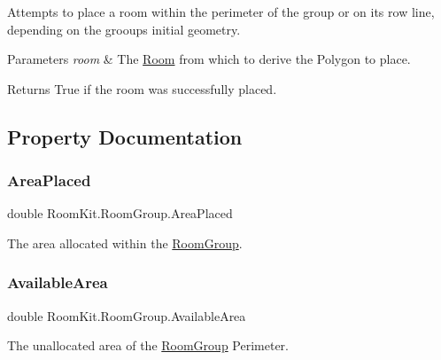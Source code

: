 Attempts to place a room within the perimeter of the group or on its row line, depending on the grooup\textquotesingle{}s initial geometry. 


\begin{DoxyParams}{Parameters}
{\em room} & The \mbox{\hyperlink{class_room_kit_1_1_room}{Room}} from which to derive the Polygon to place.\\
\hline
\end{DoxyParams}
\begin{DoxyReturn}{Returns}
True if the room was successfully placed. 
\end{DoxyReturn}


\subsection{Property Documentation}
\mbox{\label{class_room_kit_1_1_room_group_af3839f139987ea48a2e5db693d3ff957}} 
\subsubsection{\texorpdfstring{Area\+Placed}{AreaPlaced}}
{\footnotesize\ttfamily double Room\+Kit.\+Room\+Group.\+Area\+Placed\hspace{0.3cm}{\ttfamily [get]}}



The area allocated within the \mbox{\hyperlink{class_room_kit_1_1_room_group}{Room\+Group}}. 

\mbox{\label{class_room_kit_1_1_room_group_ab3bb576979e3e0c610b2afcb4d7744b3}} 
\subsubsection{\texorpdfstring{Available\+Area}{AvailableArea}}
{\footnotesize\ttfamily double Room\+Kit.\+Room\+Group.\+Available\+Area\hspace{0.3cm}{\ttfamily [get]}}



The unallocated area of the \mbox{\hyperlink{class_room_kit_1_1_room_group}{Room\+Group}} Perimeter. 

